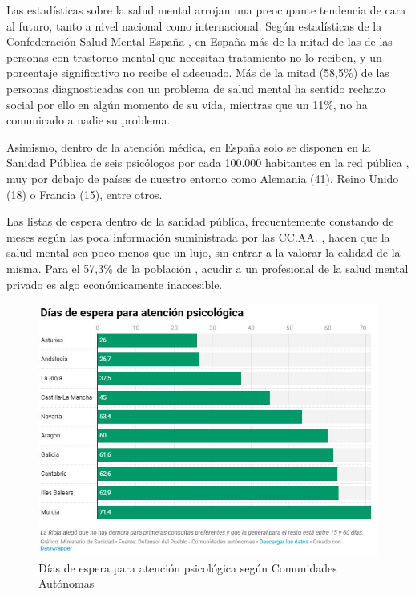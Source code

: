 Las estadísticas sobre la salud mental arrojan una preocupante tendencia de cara al futuro, tanto a nivel nacional como internacional. Según estadísticas de la Confederación Salud Mental España \cite{confederacion_salud_mental_espana_salud_nodate} \cite{aguilar_laura_2022},  en España más de la mitad de las de las personas con trastorno mental que necesitan tratamiento no lo reciben, y un porcentaje significativo no recibe el adecuado. Más de la mitad (58,5\%) de las personas diagnosticadas con un problema de salud mental ha sentido rechazo social por ello en algún momento de su vida, mientras que un 11\%, no ha comunicado a nadie su problema.

Asimismo, dentro de la atención médica, en España solo se disponen en la Sanidad Pública de seis psicólogos por cada 100.000 habitantes en la red pública \cite{antolin_listas_2023}, muy por debajo de países de nuestro entorno como Alemania (41), Reino Unido (18) o Francia (15), entre otros. 

Las listas de espera dentro de la sanidad pública, frecuentemente constando de meses según las poca información suministrada por las CC.AA. \cite{asuar_gallego_recurrir_2021} \cite{pascual_listas_2021}, hacen que la salud mental sea poco menos que un lujo, sin entrar a la valorar la calidad de la misma. Para el 57,3\% de la población  \cite{comunicacion_cuatro_2023}, acudir a un profesional de la salud mental privado es algo económicamente inaccesible.

\begin{figure}[h]
    \centering
    \includegraphics[width=1\linewidth]{figures/dias espera.JPG}
    \caption[Días de espera para atención psicológica según Comunidades Autónomas]{Días de espera para atención psicológica según Comunidades Autónomas \cite{asuar_gallego_recurrir_2021}}
    \label{fig:intro:dias_espera}
\end{figure}

